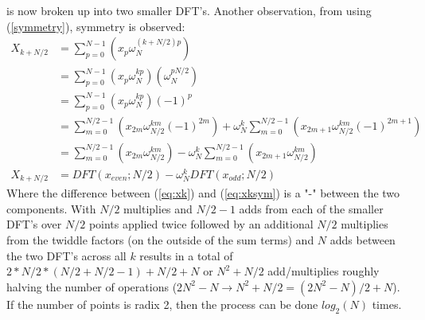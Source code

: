 \documentclass{article}
\begin{document}
%
is now broken up into two smaller DFT's.
Another observation, from using (\ref{symmetry}), symmetry is observed:
%
\begin {equation} \label {eq:xksym}
\begin {aligned}
X_{k + N/2} &= \sum_{p = 0}^{N-1} (x_p \omega_N^{(k + N/2) p}) \\
            &= \sum_{p = 0}^{N-1} (x_p \omega_N^{k p}) (\omega_N^{p N/2}) \\
            &= \sum_{p = 0}^{N-1} (x_p \omega_N^{k p}) (-1)^p \\
            &= \sum_{m = 0}^{N/2-1} (x_{2m} \omega_{N/2}^{k m} (-1)^{2m}) + \omega_N^{k} \sum_{m = 0}^{N/2-1} (x_{2m+1} \omega_{N/2}^{km} (-1)^{2m+1}) \\
            &= \sum_{m = 0}^{N/2-1} (x_{2m} \omega_{N/2}^{k m}) - \omega_N^{k} \sum_{m = 0}^{N/2-1} (x_{2m+1} \omega_{N/2}^{km}) \\
X_{k + N/2} &= DFT(x_{even}; N/2) - \omega_N^{k} DFT(x_{odd}; N/2)
%
\end {aligned}
\end {equation}
%
Where the difference between (\ref{eq:xk}) and (\ref{eq:xksym}) is a "-" between the two components.
With $N/2$ multiplies and $N/2 - 1$ adds from each of the smaller DFT's over $N/2$ points applied twice followed by an additional $N/2$ multiplies from the twiddle factors (on the outside of the sum terms) and $N$ adds between the two DFT's across all $k$ results in a total of $2 * N/2 * (N/2 + N/2 - 1) + N/2 + N$ or $N^2 + N/2$ add/multiplies roughly halving the number of operations ($2 N^2 - N \rightarrow N^2 + N/2 = (2 N^2 - N) / 2 + N$).
If the number of points is radix 2, then the process can be done $log_2 (N)$ times.
%
\end{document}
